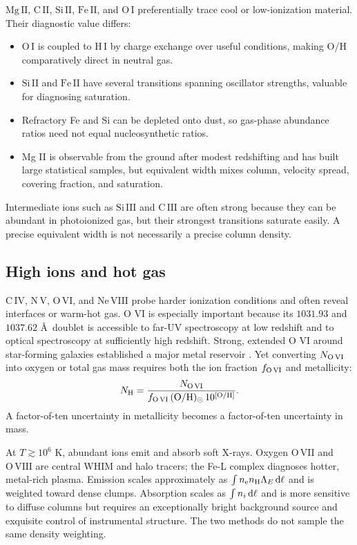 $\mathrm{Mg\,II}$, $\mathrm{C\,II}$, $\mathrm{Si\,II}$,
$\mathrm{Fe\,II}$, and $\mathrm{O\,I}$ preferentially trace cool or
low-ionization material. Their diagnostic value differs:
\begin{itemize}
  \item $\mathrm{O\,I}$ is coupled to $\mathrm{H\,I}$ by charge exchange over
  useful conditions, making O/H comparatively direct in neutral gas.
  \item $\mathrm{Si\,II}$ and $\mathrm{Fe\,II}$ have several transitions
  spanning oscillator strengths, valuable for diagnosing saturation.
  \item Refractory Fe and Si can be depleted onto dust, so gas-phase abundance
  ratios need not equal nucleosynthetic ratios.
  \item Mg II is observable from the ground after modest redshifting and has
  built large statistical samples, but equivalent width mixes column,
  velocity spread, covering fraction, and saturation.
\end{itemize}

Intermediate ions such as $\mathrm{Si\,III}$ and $\mathrm{C\,III}$ are often
strong because they can be abundant in photoionized gas, but their strongest
transitions saturate easily. A precise equivalent width is not necessarily a
precise column density.

\subsection{High ions and hot gas}

$\mathrm{C\,IV}$, $\mathrm{N\,V}$, $\mathrm{O\,VI}$, and
$\mathrm{Ne\,VIII}$ probe harder ionization conditions and often reveal
interfaces or warm-hot gas. O VI is especially important because its
$1031.93$ and $1037.62$ \AA\ doublet is accessible to far-UV spectroscopy at
low redshift and to optical spectroscopy at sufficiently high redshift.
Strong, extended O VI around star-forming galaxies established a major metal
reservoir \citep{Tumlinson2011}. Yet converting $N_{\rm O\,VI}$ into oxygen
or total gas mass requires both the ion fraction $f_{\rm O\,VI}$ and
metallicity:
\begin{equation}
 N_{\rm H} =
 \frac{N_{\rm O\,VI}}
 {f_{\rm O\,VI}\,({\rm O/H})_{\odot}\,10^{[{\rm O/H}]}} .
 \label{eq:ovi-correction}
\end{equation}
A factor-of-ten uncertainty in metallicity becomes a factor-of-ten
uncertainty in mass.

At $T\gtrsim10^{6}$ K, abundant ions emit and absorb soft X-rays. Oxygen
$\mathrm{O\,VII}$ and $\mathrm{O\,VIII}$ are central WHIM and halo tracers;
the Fe-L complex diagnoses hotter, metal-rich plasma. Emission scales
approximately as $\int n_{\rm e}n_{\rm H}\Lambda_E\,{\rm d}\ell$ and is
weighted toward dense clumps. Absorption scales as $\int n_i\,{\rm d}\ell$
and is more sensitive to diffuse columns but requires an exceptionally bright
background source and exquisite control of instrumental structure. The two
methods do not sample the same density weighting.

